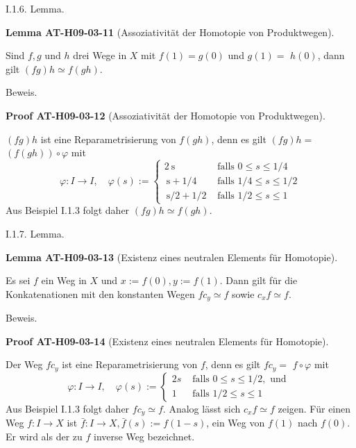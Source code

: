 \documentclass[10pt, letterpaper]{article}
\newcommand{\CustomHeading}[3]{%
  \par\medskip\noindent%
  \textbf{#1 #2} \textnormal{(#3)}.\enskip%
}
\newenvironment{LEM}[2]{\begin{unitbox}\CustomHeading{Lemma}{#1}{#2}}{\end{unitbox}}
\newenvironment{PROOF}[2]{\begin{unitbox}\CustomHeading{Proof}{#1}{#2}}{\end{unitbox}}
\begin{document}
I.1.6. Lemma. 



\begin{LEM}{AT-H09-03-11}{Assoziativität der Homotopie von Produktwegen}
Sind $f, g$ und $h$ drei Wege in $X$ mit $f(1)=g(0)$ und $g(1)=$ $h(0)$, dann gilt $(f g) h \simeq f(g h)$.
\end{LEM}


Beweis. 


\begin{PROOF}{AT-H09-03-12}{Assoziativität der Homotopie von Produktwegen}
$(fg)h$ ist eine Reparametrisierung von $f(g h)$, denn es gilt $(f g) h=$ $(f(g h)) \circ \varphi$ mit
$$
\varphi: I \rightarrow I, \quad \varphi(s):= \begin{cases}2 \mathrm{~s} & \text { falls } 0 \leq s \leq 1 / 4 \\ \mathrm{~s}+1 / 4 & \text { falls } 1 / 4 \leq s \leq 1 / 2 \\ \mathrm{~s} / 2+1 / 2 & \text { falls } 1 / 2 \leq s \leq 1\end{cases}
$$
Aus Beispiel I.1.3 folgt daher $(f g) h \simeq f(g h)$.
\end{PROOF}





I.1.7. Lemma. 

\begin{LEM}{AT-H09-03-13}{Existenz eines neutralen Elements für Homotopie}
Es sei $f$ ein Weg in $X$ und $x:=f(0), y:=f(1)$. Dann gilt für die Konkatenationen mit den konstanten Wegen $f c_{y} \simeq f$ sowie $c_{x} f \simeq f$.
\end{LEM}

Beweis. 

\begin{PROOF}{AT-H09-03-14}{Existenz eines neutralen Elements für Homotopie}
Der Weg $f c_{y}$ ist eine Reparametrisierung von $f$, denn es gilt $f c_{y}=$ $f \circ \varphi$ mit
$$
\varphi: I \rightarrow I, \quad \varphi(s):= \begin{cases}2 s & \text { falls } 0 \leq s \leq 1 / 2, \text { und } \\ 1 & \text { falls } 1 / 2 \leq s \leq 1\end{cases}
$$
Aus Beispiel I.1.3 folgt daher $f c_{y} \simeq f$. Analog lässt sich $c_{x} f \simeq f$ zeigen.
Für einen Weg $f: I \rightarrow X$ ist $\bar{f}: I \rightarrow X, \bar{f}(s):=f(1-s)$, ein Weg von $f(1)$ nach $f(0)$. Er wird als der zu $f$ inverse Weg bezeichnet.
\end{PROOF}
\end{document}
